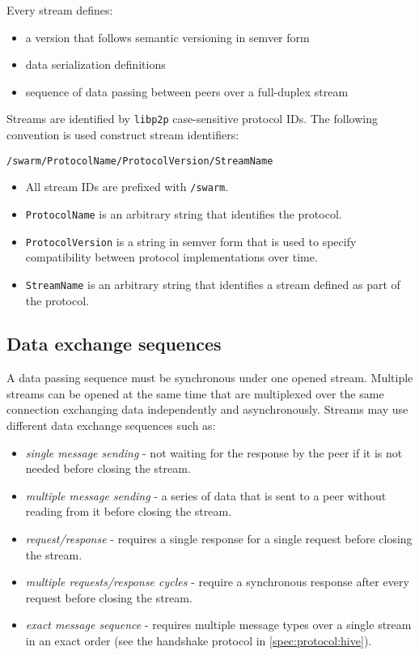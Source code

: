 Every stream defines:

\begin{itemize}
\item a version that follows semantic versioning in semver form
\item data serialization definitions
\item sequence of data passing between peers over a full-duplex stream
\end{itemize}

Streams are identified by \lstinline{libp2p} case-sensitive protocol IDs. The following convention is used construct stream identifiers:

\begin{lstlisting}
/swarm/ProtocolName/ProtocolVersion/StreamName
\end{lstlisting}

\begin{itemize}
\item All stream IDs are prefixed with \lstinline{/swarm}.
\item \lstinline{ProtocolName} is an arbitrary string that identifies the protocol.
\item \lstinline{ProtocolVersion} is a string in semver form that is used to specify compatibility between protocol implementations over time.
\item \lstinline{StreamName} is an arbitrary string that identifies a stream defined as part of the protocol.
\end{itemize}

\subsection{Data exchange sequences \statusgreen}

A data passing sequence must be synchronous under one opened stream. Multiple streams can be opened at the same time that are multiplexed over the same connection exchanging data independently and asynchronously. Streams may use different data exchange sequences such as:

\begin{itemize}
\item \emph{single message sending} - not waiting for the response by the peer if it is not needed before closing the stream.
\item \emph{multiple message sending} - a series of data that is sent to a peer without reading from it before closing the stream.
\item \emph{request/response} - requires a single response for a single request before closing the stream.
\item \emph{multiple requests/response cycles} - require a synchronous response after every request before closing the stream.
\item \emph{exact message sequence} -  requires multiple message types over a single stream in an exact order (see the handshake protocol in \ref{spec:protocol:hive}).
\end{itemize}

